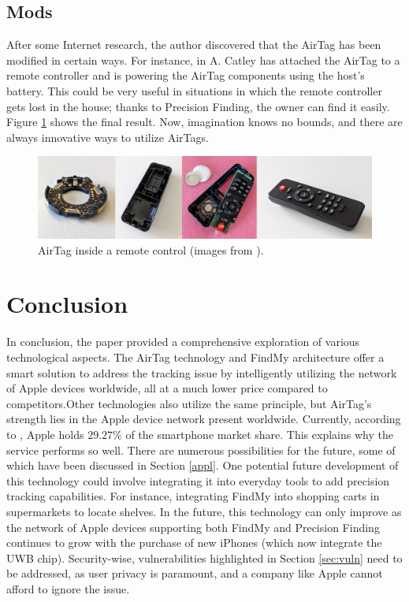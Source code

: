 \documentclass[english]{article}
\begin{document}
\subsection{Mods}
After some Internet research, the author discovered that the AirTag has been modified in certain ways. For instance, in \cite{telecomando} A. Catley has attached the AirTag to a remote controller and is powering the AirTag components using the host's battery. This could be very useful in situations in which the remote controller gets lost in the house; thanks to Precision Finding, the owner can find it easily. Figure \ref{img:controller} shows the final result.
Now, imagination knows no bounds, and there are always innovative ways to utilize AirTags.
\begin{figure}[]
	\centering
	\includegraphics[width=\textwidth]{images/remote.jpg}
	\caption{AirTag inside a remote control (images from \cite{reverse}).}
	\label{img:controller}
\end{figure}

\section{Conclusion}
In conclusion, the paper provided a comprehensive exploration of various technological aspects. The AirTag technology and FindMy architecture offer a smart solution to address the tracking issue by intelligently utilizing the network of Apple devices worldwide, all at a much lower price compared to competitors.Other technologies also utilize the same principle, but AirTag's strength lies in the Apple device network present worldwide. Currently, according to \cite{Lin}, Apple holds $29.27\%$ of the smartphone market share. This explains why the service performs so well. There are numerous possibilities for the future, some of which have been discussed in Section \ref{appl}. One potential future development of this technology could involve integrating it into everyday tools to add precision tracking capabilities. For instance, integrating FindMy into shopping carts in supermarkets to locate shelves. In the future, this technology can only improve as the network of Apple devices supporting both FindMy and Precision Finding continues to grow with the purchase of new iPhones (which now integrate the UWB chip). Security-wise, vulnerabilities highlighted in Section \ref{sec:vuln} need to be addressed, as user privacy is paramount, and a company like Apple cannot afford to ignore the issue.
\printbibliography
\nocite{*}
\end{document}
